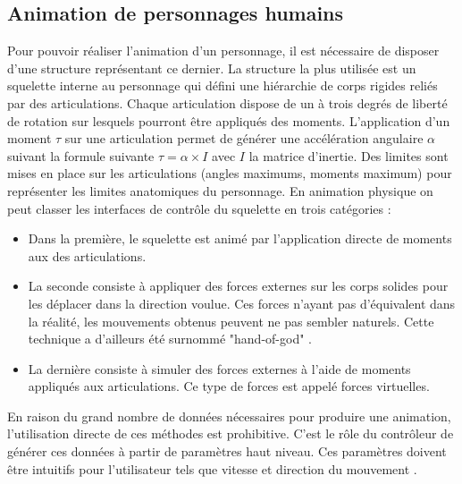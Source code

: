 \documentclass[runningheads,a4paper]{llncs}
\begin{document}
\subsection{Animation de personnages humains} 
Pour pouvoir réaliser l'animation d'un personnage, il est nécessaire de disposer d'une structure représentant ce dernier. La structure la plus utilisée est un squelette interne au personnage qui défini une hiérarchie de corps rigides reliés par des articulations. Chaque articulation dispose de un à trois degrés de liberté de rotation sur lesquels pourront être appliqués des moments. L'application d'un moment $\tau$ sur une articulation permet de générer une accélération angulaire $\alpha$ suivant la formule suivante $\tau=\alpha \times I$ avec $I$ la matrice d'inertie. Des limites sont mises en place sur les articulations (angles maximums, moments maximum) pour représenter les limites anatomiques du personnage. 
 En animation physique on peut classer les interfaces de contrôle du squelette en trois catégories \cite{geijtenbeek2012interactive}:
\begin{itemize}
\item{Dans la première, le squelette est animé par l'application directe de moments aux des articulations.}
\item{La seconde consiste à appliquer des forces externes sur les corps solides pour les déplacer dans la direction voulue. Ces forces n'ayant pas d'équivalent dans la réalité, les mouvements obtenus peuvent ne pas sembler naturels. Cette technique a d'ailleurs été surnommé "hand-of-god" \cite{van1995guided}. }
\item{La dernière consiste à simuler des forces externes à l'aide de moments appliqués aux articulations. Ce type de forces est appelé forces virtuelles.}
\end{itemize}

En raison du grand nombre de données nécessaires pour produire une animation, l'utilisation directe de ces méthodes est prohibitive. C'est le rôle du contrôleur de générer ces données à partir de paramètres haut niveau. Ces paramètres doivent être intuitifs pour l'utilisateur tels que vitesse et direction du mouvement \cite{coros2010generalized}. 
\end{document}
